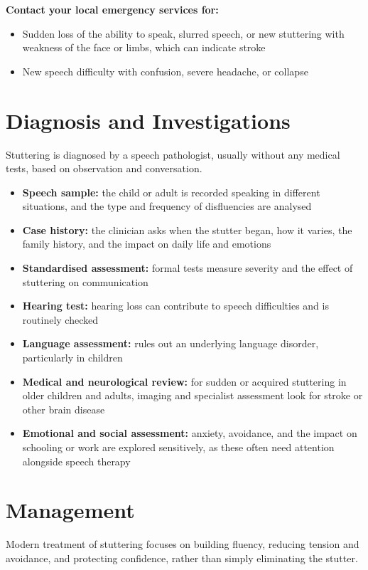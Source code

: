 \textbf{Contact your local emergency services for:}
\begin{itemize}
    \item Sudden loss of the ability to speak, slurred speech, or new stuttering with weakness of the face or limbs, which can indicate stroke
    \item New speech difficulty with confusion, severe headache, or collapse
\end{itemize}

\section*{Diagnosis and Investigations}
Stuttering is diagnosed by a speech pathologist, usually without any medical tests, based on observation and conversation.

\begin{itemize}
    \item \textbf{Speech sample:} the child or adult is recorded speaking in different situations, and the type and frequency of disfluencies are analysed
    \item \textbf{Case history:} the clinician asks when the stutter began, how it varies, the family history, and the impact on daily life and emotions
    \item \textbf{Standardised assessment:} formal tests measure severity and the effect of stuttering on communication
    \item \textbf{Hearing test:} hearing loss can contribute to speech difficulties and is routinely checked
    \item \textbf{Language assessment:} rules out an underlying language disorder, particularly in children
    \item \textbf{Medical and neurological review:} for sudden or acquired stuttering in older children and adults, imaging and specialist assessment look for stroke or other brain disease
    \item \textbf{Emotional and social assessment:} anxiety, avoidance, and the impact on schooling or work are explored sensitively, as these often need attention alongside speech therapy
\end{itemize}

\section*{Management}
Modern treatment of stuttering focuses on building fluency, reducing tension and avoidance, and protecting confidence, rather than simply eliminating the stutter.

